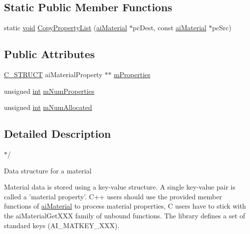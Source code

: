 \subsection*{Static Public Member Functions}
\begin{DoxyCompactItemize}
\item 
static \hyperlink{_s_d_l__opengl_8h_a3db05964a3cc4410f35b7ea2b7eb850d}{void} \hyperlink{structai_material_ac6fe63be37f91e38174f192cfbdf22f3}{Copy\-Property\-List} (\hyperlink{structai_material}{ai\-Material} $\ast$pc\-Dest, const \hyperlink{structai_material}{ai\-Material} $\ast$pc\-Src)
\end{DoxyCompactItemize}
\subsection*{Public Attributes}
\begin{DoxyCompactItemize}
\item 
\hyperlink{defs_8h_ab51df4230ceb602bbc1bc109c432a6a0}{C\-\_\-\-S\-T\-R\-U\-C\-T} ai\-Material\-Property $\ast$$\ast$ \hyperlink{structai_material_af32b125d54bff5bc1fc54a1007487cab}{m\-Properties}
\item 
unsigned \hyperlink{_s_d_l__thread_8h_a6a64f9be4433e4de6e2f2f548cf3c08e}{int} \hyperlink{structai_material_a243b07afdc6507f8878c93a2cafe4963}{m\-Num\-Properties}
\item 
unsigned \hyperlink{_s_d_l__thread_8h_a6a64f9be4433e4de6e2f2f548cf3c08e}{int} \hyperlink{structai_material_a84a0016a263362c52b27a9d8d76dc449}{m\-Num\-Allocated}
\end{DoxyCompactItemize}


\subsection{Detailed Description}
$\ast$/ 

Data structure for a material

Material data is stored using a key-\/value structure. A single key-\/value pair is called a 'material property'. C++ users should use the provided member functions of \hyperlink{structai_material}{ai\-Material} to process material properties, C users have to stick with the ai\-Material\-Get\-X\-X\-X family of unbound functions. The library defines a set of standard keys (A\-I\-\_\-\-M\-A\-T\-K\-E\-Y\-\_\-\-X\-X\-X). 

